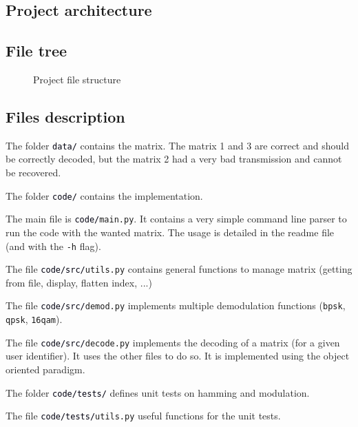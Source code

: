 \documentclass[a4paper, 12pt, twoside]{article}
\begin{document}
\begin{indt}{\section{Project architecture}}
\begin{indt}{\subsection{File tree}}
\begin{figure}[H]
                \caption{Project file structure}
                \label{fig:forest}
            \end{figure}%
        \end{indt} %

        \begin{indt}{\subsection{Files description}} %
            The folder \texttt{\textcolor{00f}{data/}} contains the matrix. The matrix 1 and 3 are correct and should be correctly decoded, but the matrix 2 had a very bad transmission and cannot be recovered. 
            
            The folder \texttt{\textcolor{00f}{code/}} contains the implementation.
            
            The main file is \texttt{\textcolor{00f}{code/}main.py}. It contains a very simple command line parser to run the code with the wanted matrix.
            The usage is detailed in the readme file (and with the \texttt{-h} flag).
            
            The file \texttt{\textcolor{00f}{code/src/}utils.py} contains general functions to manage matrix (getting from file, display, flatten index, ...)
            
            The file \texttt{\textcolor{00f}{code/src/}demod.py} implements multiple demodulation functions (\texttt{bpsk}, \texttt{qpsk}, \texttt{16qam}).
            
            The file \texttt{\textcolor{00f}{code/src/}decode.py} implements the decoding of a matrix (for a given user identifier).
            It uses the other files to do so.
            It is implemented using the object oriented paradigm.
            
            The folder \texttt{\textcolor{00f}{code/tests/}} defines unit tests on hamming and modulation.
            
            The file \texttt{\textcolor{00f}{code/tests/}utils.py} useful functions for the unit tests.
        \end{indt} %
    \end{indt}%
\end{document}

